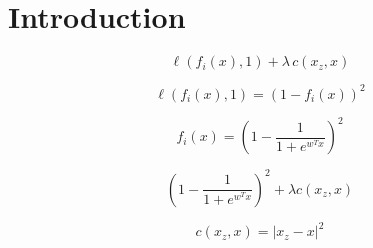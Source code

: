 \documentclass{article}
\begin{document}
\section{Introduction}

\begin{equation}
\label{eq:recourse}
\ell(f_i(x), 1) + \lambda \, c(x_z, x)
\end{equation}

\begin{equation}
\ell(f_i(x), 1) = (1 - f_i(x))^2
\end{equation}

\begin{equation}
f_i(x) = (1-\frac{1}{1+e^{w^T x}})^2
\end{equation}

\begin{equation}
(1-\frac{1}{1+e^{w^T x}})^2 + \lambda c(x_z, x)
\end{equation}

\begin{equation}
c(x_z, x) = |x_z - x|^2 
\end{equation}
\end{document}

